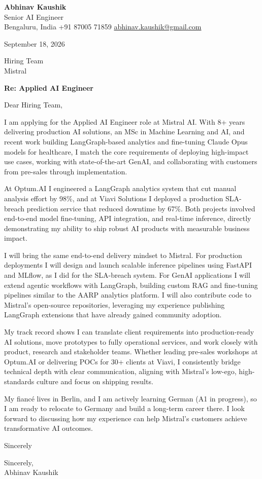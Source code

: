 \documentclass[11pt,a4paper]{article}
\begin{document}
{\Large\bfseries Abhinav Kaushik}\\
Senior AI Engineer\\
Bengaluru, India \textbar{} +91 87005 71859 \textbar{} \href{mailto:abhinav.kaushik@gmail.com}{abhinav.kaushik@gmail.com}

September 18, 2026

Hiring Team\\
Mistral

\textbf{Re: Applied AI Engineer}

Dear Hiring Team,

I am applying for the Applied AI Engineer role at Mistral AI. With 8+ years delivering production AI solutions, an MSc in Machine Learning and AI, and recent work building LangGraph-based analytics and fine-tuning Claude Opus models for healthcare, I match the core requirements of deploying high-impact use cases, working with state-of-the-art GenAI, and collaborating with customers from pre-sales through implementation.

At Optum.AI I engineered a LangGraph analytics system that cut manual analysis effort by 98\%, and at Viavi Solutions I deployed a production SLA-breach prediction service that reduced downtime by 67\%. Both projects involved end-to-end model fine-tuning, API integration, and real-time inference, directly demonstrating my ability to ship robust AI products with measurable business impact.

I will bring the same end-to-end delivery mindset to Mistral. For production deployments I will design and launch scalable inference pipelines using FastAPI and MLflow, as I did for the SLA-breach system. For GenAI applications I will extend agentic workflows with LangGraph, building custom RAG and fine-tuning pipelines similar to the AARP analytics platform. I will also contribute code to Mistral's open-source repositories, leveraging my experience publishing LangGraph extensions that have already gained community adoption.

My track record shows I can translate client requirements into production-ready AI solutions, move prototypes to fully operational services, and work closely with product, research and stakeholder teams. Whether leading pre-sales workshops at Optum.AI or delivering POCs for 30+ clients at Viavi, I consistently bridge technical depth with clear communication, aligning with Mistral's low-ego, high-standards culture and focus on shipping results.

My fiancé lives in Berlin, and I am actively learning German (A1 in progress), so I am ready to relocate to Germany and build a long-term career there. I look forward to discussing how my experience can help Mistral's customers achieve transformative AI outcomes.

Sincerely

Sincerely,\\[4pt]
Abhinav Kaushik
\end{document}
